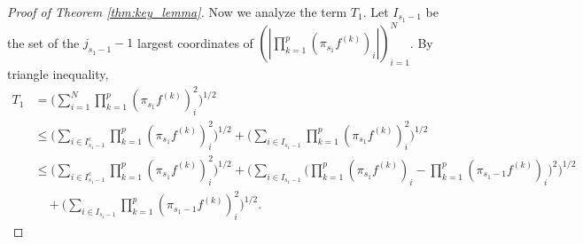 \documentclass[numbers,webpdf,imaiai]{ima-authoring-template}
\theoremstyle{thmstyletwo}%
\numberwithin{equation}{section}
\numberwithin{equation}{section}
\begin{document}
\begin{proof}[Proof of Theorem \ref{thm:key_lemma}]


Now we analyze the term $T_1$. Let $I_{s_1-1}$ be the set of the $j_{s_1-1}-1$ largest coordinates of $(|\prod_{k=1}^{p}(\pi_{s_1} f^{(k)})_{i}|)_{i=1}^{N}$. By triangle inequality,
\begin{align*}
   T_1&= \bigg(\sum_{i=1}^{N}\prod_{k=1}^{p}(\pi_{s_1}f^{(k)})_i^2\bigg)^{1/2} \\
   &\le \bigg(\sum_{i\in I_{s_1-1}^c} \prod_{k=1}^{p}(\pi_{s_1}f^{(k)})_i^2\bigg)^{1/2}+\bigg(\sum_{i\in I_{s_1-1}} \prod_{k=1}^{p}(\pi_{s_1}f^{(k)})_i^2\bigg)^{1/2}\\
    &\le \bigg(\sum_{i\in I_{s_1-1}^c} \prod_{k=1}^{p}(\pi_{s_1}f^{(k)})_i^2\bigg)^{1/2}+\Bigg(\sum_{i\in I_{s_1-1}} \bigg(\prod_{k=1}^{p}(\pi_{s_1}f^{(k)})_i-\prod_{k=1}^{p}(\pi_{s_1-1}f^{(k)})_i\bigg)^2\Bigg)^{1/2}\\
    &\quad +\bigg(\sum_{i\in I_{s_1-1}} \prod_{k=1}^{p}(\pi_{s_1-1}f^{(k)})_i^2\bigg)^{1/2}.
\end{align*}


\end{proof}
\end{document}
